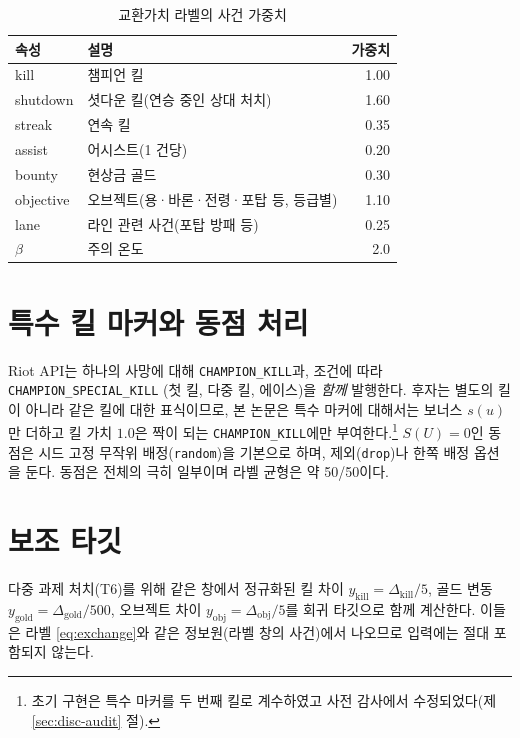 \begin{table}[htbp]
  \centering
  \caption{교환가치 라벨의 사건 가중치}
  \label{tab:label-weights}
  \small
  \begin{tabular}{@{}llr@{}}
    \toprule
    속성 & 설명 & 가중치 \\
    \midrule
    kill & 챔피언 킬 & 1.00 \\
    shutdown & 셧다운 킬(연승 중인 상대 처치) & 1.60 \\
    streak & 연속 킬 & 0.35 \\
    assist & 어시스트(1 건당) & 0.20 \\
    bounty & 현상금 골드 & 0.30 \\
    objective & 오브젝트(용·바론·전령·포탑 등, 등급별) & 1.10 \\
    lane & 라인 관련 사건(포탑 방패 등) & 0.25 \\
    \midrule
    $\beta$ & 주의 온도 & 2.0 \\
    \bottomrule
  \end{tabular}
\end{table}

\section{특수 킬 마커와 동점 처리}
\label{sec:label-special}

Riot API는 하나의 사망에 대해 \texttt{CHAMPION\_KILL}과, 조건에 따라 \texttt{CHAMPION\_SPECIAL\_KILL} (첫 킬, 다중 킬, 에이스)을 \emph{함께} 발행한다. 후자는 별도의 킬이 아니라 같은 킬에 대한 표식이므로, 본 논문은 특수 마커에 대해서는 보너스 $s(u)$만 더하고 킬 가치 $1.0$은 짝이 되는 \texttt{CHAMPION\_KILL}에만 부여한다.\footnote{초기 구현은 특수 마커를 두 번째 킬로 계수하였고 사전 감사에서 수정되었다(제 \ref{sec:disc-audit} 절).} $S(U) = 0$인 동점은 시드 고정 무작위 배정(\texttt{random})을 기본으로 하며, 제외(\texttt{drop})나 한쪽 배정 옵션을 둔다. 동점은 전체의 극히 일부이며 라벨 균형은 약 50/50이다.

\section{보조 타깃}
\label{sec:label-aux}

다중 과제 처치(T6)를 위해 같은 창에서 정규화된 킬 차이 $y_{\mathrm{kill}} = \Delta_{\mathrm{kill}}/5$, 골드 변동 $y_{\mathrm{gold}} = \Delta_{\mathrm{gold}}/500$, 오브젝트 차이 $y_{\mathrm{obj}} = \Delta_{\mathrm{obj}}/5$를 회귀 타깃으로 함께 계산한다. 이들은 라벨 \eqref{eq:exchange}와 같은 정보원(라벨 창의 사건)에서 나오므로 입력에는 절대 포함되지 않는다.
